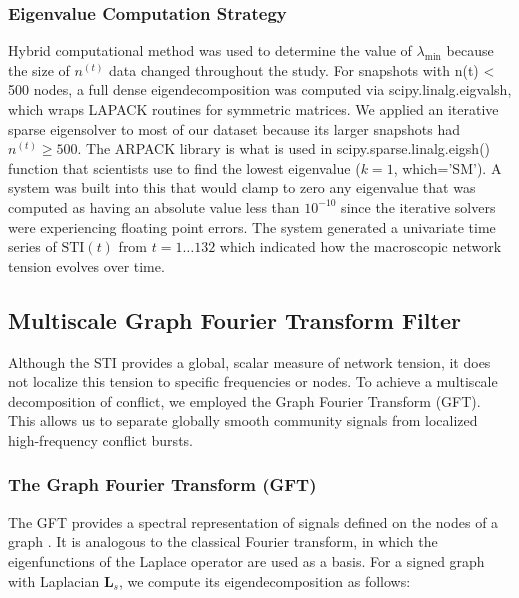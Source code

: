 \documentclass[a4paper,fleqn]{cas-dc}
\begin{document}
\subsubsection{Eigenvalue Computation Strategy}

Hybrid computational method was used to determine the value of 
$\lambda_{\text{min}}$ because the size of $n^{(t)}$ data changed 
throughout the study. For snapshots with n(t) < 500 nodes, a full dense eigendecomposition was computed via scipy.linalg.eigvalsh, which wraps LAPACK routines for symmetric matrices. We applied an iterative sparse 
eigensolver to most of our dataset because its larger snapshots had 
$n^{(t)} \ge 500$. The ARPACK library is what is used in
scipy.sparse.linalg.eigsh() function that scientists use to find 
the lowest eigenvalue ($k=1$, which='SM'). A system was built into this that 
would clamp to zero any eigenvalue that was computed as having an absolute 
value less than $10^{-10}$ since the iterative solvers were experiencing 
floating point errors. The system generated a univariate time series of 
$\text{STI}(t)$ from $t = 1 \dots 132$ which indicated how the macroscopic 
network tension evolves over time.

\subsection{Multiscale Graph Fourier Transform Filter}
\label{sec:objective2_gft}

Although the STI provides a global, scalar measure of network tension, it does not localize this tension to specific frequencies or nodes. To achieve a multiscale decomposition of conflict, we employed the Graph Fourier Transform (GFT). This allows us to separate globally smooth community signals from localized high-frequency conflict bursts.

\subsubsection{The Graph Fourier Transform (GFT)}
\label{subsec:gft_theory}

The GFT provides a spectral representation of signals defined on the nodes of a graph \cite{17_Shuman2013, 18_Ortega2018}. It is analogous to the classical Fourier transform, in which the eigenfunctions of the Laplace operator are used as a basis. For a signed graph with Laplacian \( \mathbf{L}_s \), we compute its eigendecomposition as follows:
\end{document}
